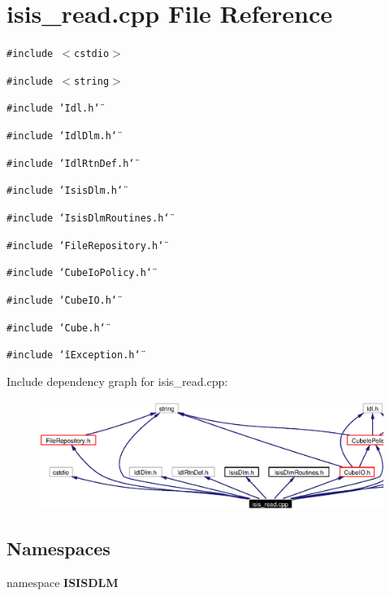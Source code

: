 \section{isis\_\-read.cpp File Reference}
\label{isis__read_8cpp}
{\tt \#include $<$cstdio$>$}\par
{\tt \#include $<$string$>$}\par
{\tt \#include \char`\"{}Idl.h\char`\"{}}\par
{\tt \#include \char`\"{}Idl\-Dlm.h\char`\"{}}\par
{\tt \#include \char`\"{}Idl\-Rtn\-Def.h\char`\"{}}\par
{\tt \#include \char`\"{}Isis\-Dlm.h\char`\"{}}\par
{\tt \#include \char`\"{}Isis\-Dlm\-Routines.h\char`\"{}}\par
{\tt \#include \char`\"{}File\-Repository.h\char`\"{}}\par
{\tt \#include \char`\"{}Cube\-Io\-Policy.h\char`\"{}}\par
{\tt \#include \char`\"{}Cube\-IO.h\char`\"{}}\par
{\tt \#include \char`\"{}Cube.h\char`\"{}}\par
{\tt \#include \char`\"{}i\-Exception.h\char`\"{}}\par


Include dependency graph for isis\_\-read.cpp:\begin{figure}[H]
\begin{center}
\leavevmode
\includegraphics[width=391pt]{isis__read_8cpp__incl}
\end{center}
\end{figure}
\subsection*{Namespaces}
\begin{CompactItemize}
\item 
namespace {\bf ISISDLM}
\end{CompactItemize}
